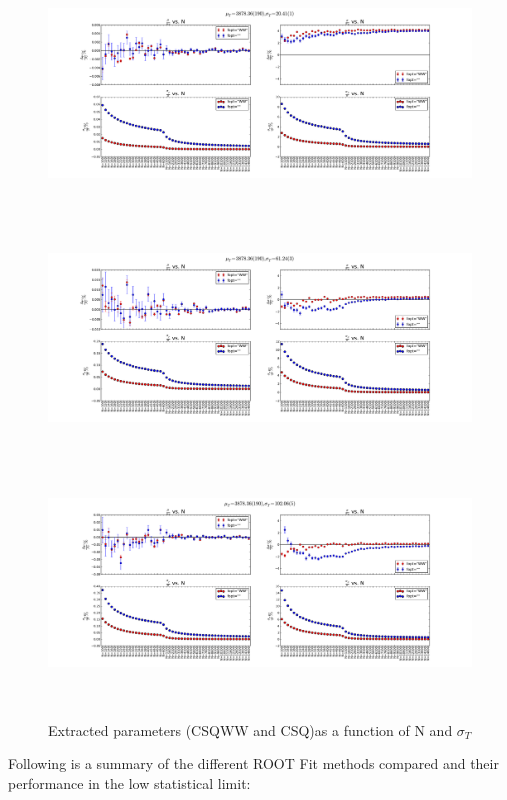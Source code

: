 \documentclass[12pt]{article}
\begin{document}
\begin{figure}[ht]
	\includegraphics[height=2.5in,width=5.5in]{fit-comp_MU-190_SG-1_fit-opt-WW_binw-1.pdf}
	\includegraphics[height=2.5in,width=5.5in]{fit-comp_MU-190_SG-3_fit-opt-WW_binw-1.pdf}
	\includegraphics[height=2.5in,width=5.5in]{fit-comp_MU-190_SG-5_fit-opt-WW_binw-1.pdf}
	\caption{Extracted parameters (CSQWW and CSQ)as a function of N and $\sigma_{T}$}
	\label{fig3}
\end{figure}

\clearpage

Following is a summary of the different ROOT Fit methods compared and their performance in the low statistical limit:
\end{document}
